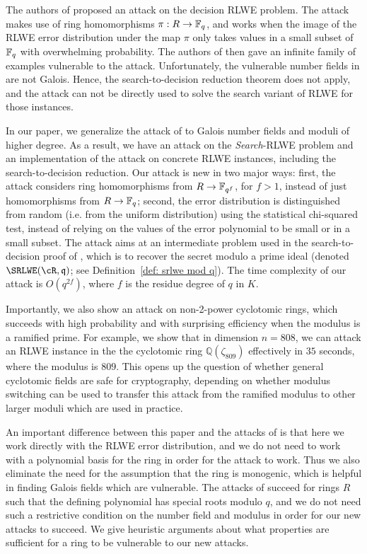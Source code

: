 \documentclass[envcountsame]{llncs}
\begin{document}
The authors of \cite{elos2015weak} proposed an attack on the decision RLWE problem. The attack makes use of ring homomorphisms $\pi: R \to \mathbb{F}_q$, and works when the image of the RLWE error distribution under the map $\pi$ only takes values in a small subset of $\mathbb{F}_q$ with overwhelming probability. The authors of \cite{elos2015weak} then gave an infinite family of examples vulnerable to the attack. Unfortunately, the vulnerable number fields in \cite{elos2015weak} are not Galois. Hence, the search-to-decision reduction theorem does not apply, and the attack can not be directly used to solve the search variant of RLWE for those instances.

In our paper, we generalize the attack of \cite{elos2015weak} to Galois number fields and moduli of higher degree. As a result, we have an attack on the {\it Search}-RLWE problem and an implementation of the attack on concrete RLWE instances, including the search-to-decision reduction.  Our attack is new in two major ways: first, the attack considers ring homomorphisms from $R \to \mathbb{F}_{q^f}$, for $f>1$, instead of just homomorphisms from $R \to \mathbb{F}_q$; second, the error distribution is distinguished from random (i.e. from the uniform distribution) using the statistical chi-squared test, instead of relying on the values of the error polynomial to be small or in a small subset.  The attack aims at an intermediate problem used in the search-to-decision proof of \cite{lyubashevsky2013ideal}, which is to recover the secret modulo a prime ideal (denoted $\SRLWE(\cR,\fq)$; see Definition~\ref{def: srlwe mod q}). The time complexity of our attack is $O(q^{2f})$, where $f$ is the {residue degree} of $q$ in $K$.

Importantly, we also show an attack on non-2-power cyclotomic rings,
which succeeds with high probability and with surprising efficiency when the modulus is a ramified prime.  For example, we show that in dimension $n=808$, we can attack an RLWE instance in the the cyclotomic ring $\mathbb{Q}(\zeta_{809})$ effectively in $35$ seconds, where the modulus is $809$.  This opens up the question of whether general cyclotomic fields are safe for cryptography, depending on whether modulus switching can be used to transfer this attack from the ramified modulus to other larger moduli which are used in practice.

An important difference between this paper and the attacks of \cite{elos2015weak} is that here we work directly with the RLWE error distribution, and we do not need to work with a polynomial basis for the ring in order for the attack to work.  Thus we also eliminate the need for the assumption that the ring is monogenic, which is helpful in finding Galois fields which are vulnerable.  The attacks of \cite{elos2015weak} succeed for rings $R$ such that the defining polynomial has special roots modulo $q$, and we do not need such a restrictive condition on the number field and modulus in order for our new attacks to succeed.  We give heuristic arguments about what properties are sufficient for a ring to be vulnerable to our new attacks.
\end{document}
